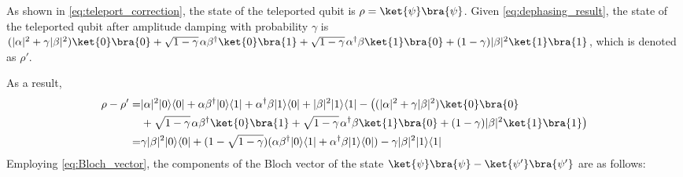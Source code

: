 As shown in \autoref{eq:teleport_correction}, the state of the teleported qubit is $\rho=\ket{\psi}\bra{\psi}$. Given \autoref{eq:dephasing_result}, the state of the teleported qubit after amplitude damping with probability $\gamma$ is $(|\alpha|^{2} + \gamma |\beta|^{2}) \ket{0}\bra{0} + \sqrt{1-\gamma} \hspace{1pt} \alpha \beta^{\dag} \ket{0}\bra{1} + \sqrt{1-\gamma} \hspace{1pt} \alpha^{\dag} \beta \ket{1}\bra{0} + (1-\gamma) |\beta|^{2} \ket{1}\bra{1}$, which is denoted as $\rho'$.

As a result,
\begin{equation}
  \begin{split}
   \rho - \rho' = & |\alpha|^{2} |0\rangle \langle 0 | + \alpha \beta^{\dag} |0\rangle \langle 1 | + \alpha^{\dag} \beta |1\rangle \langle 0 | + |\beta|^{2} |1\rangle \langle 1 |  - \big((|\alpha|^{2} + \gamma |\beta|^{2}) \ket{0}\bra{0}
   \\ & + \sqrt{1-\gamma} \hspace{1pt} \alpha \beta^{\dag} \ket{0}\bra{1} + \sqrt{1-\gamma} \hspace{1pt} \alpha^{\dag} \beta \ket{1}\bra{0} + (1-\gamma) |\beta|^{2} \ket{1}\bra{1}\big)\\
   = &  \gamma |\beta|^{2} |0\rangle \langle 0 | + (1-\sqrt{1-\gamma}) (\alpha \beta^{\dag} |0\rangle \langle 1 | + \alpha^{\dag} \beta |1\rangle \langle 0 |) - \gamma |\beta|^{2} |1\rangle \langle 1 |  
  \end{split}
\end{equation}
Employing \autoref{eq:Bloch_vector}, the components of the Bloch vector of the state $\ket{\psi}\bra{\psi} - \ket{\psi'}\bra{\psi'}$ are as follows:
